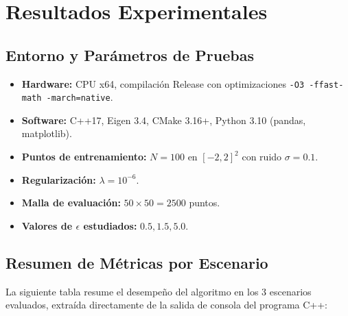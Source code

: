 \documentclass[12pt,a4paper]{article}
\theoremstyle{definition}
\begin{document}
\section{Resultados Experimentales}\label{sec:resultados}

\subsection{Entorno y Par\'{a}metros de Pruebas}
\begin{itemize}
    \item \textbf{Hardware:} CPU x64, compilaci\'{o}n Release con optimizaciones \texttt{-O3 -ffast-math -march=native}.
    \item \textbf{Software:} C++17, Eigen 3.4, CMake 3.16+, Python 3.10 (pandas, matplotlib).
    \item \textbf{Puntos de entrenamiento:} $N = 100$ en $[-2, 2]^2$ con ruido $\sigma = 0.1$.
    \item \textbf{Regularizaci\'{o}n:} $\lambda = 10^{-6}$.
    \item \textbf{Malla de evaluaci\'{o}n:} $50 \times 50 = 2500$ puntos.
    \item \textbf{Valores de $\epsilon$ estudiados:} $0.5, 1.5, 5.0$.
\end{itemize}

\subsection{Resumen de M\'{e}tricas por Escenario}

La siguiente tabla resume el desempe\~{n}o del algoritmo en los 3 escenarios evaluados, extra\'{i}da directamente de la salida de consola del programa C++:

\begin{table}[H]
\centering
\caption{M\'{e}tricas de los 3 escenarios de $\epsilon$.}
\label{tab:resumen}
\end{table}
\end{document}
